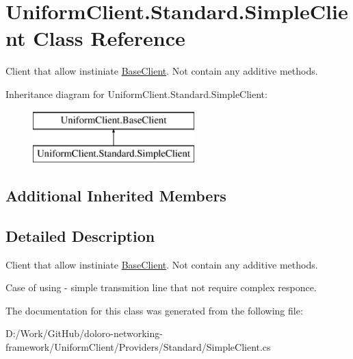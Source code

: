 \hypertarget{class_uniform_client_1_1_standard_1_1_simple_client}{}\section{Uniform\+Client.\+Standard.\+Simple\+Client Class Reference}
\label{class_uniform_client_1_1_standard_1_1_simple_client}


Client that allow instiniate \mbox{\hyperlink{class_uniform_client_1_1_base_client}{Base\+Client}}. Not contain any additive methods.  


Inheritance diagram for Uniform\+Client.\+Standard.\+Simple\+Client\+:\begin{figure}[H]
\begin{center}
\leavevmode
\includegraphics[height=2.000000cm]{d0/d21/class_uniform_client_1_1_standard_1_1_simple_client}
\end{center}
\end{figure}
\subsection*{Additional Inherited Members}


\subsection{Detailed Description}
Client that allow instiniate \mbox{\hyperlink{class_uniform_client_1_1_base_client}{Base\+Client}}. Not contain any additive methods. 

Case of using -\/ simple transmition line that not require complex responce. 

The documentation for this class was generated from the following file\+:\begin{DoxyCompactItemize}
\item 
D\+:/\+Work/\+Git\+Hub/doloro-\/networking-\/framework/\+Uniform\+Client/\+Providers/\+Standard/Simple\+Client.\+cs\end{DoxyCompactItemize}

